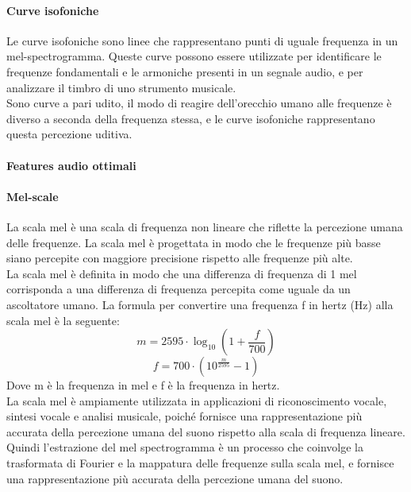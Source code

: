 \paragraph{Curve isofoniche}
Le curve isofoniche sono linee che rappresentano punti di uguale frequenza in un mel-spectrogramma. Queste curve possono essere utilizzate per identificare le frequenze fondamentali e le armoniche presenti in un segnale audio, e per analizzare il timbro di uno strumento musicale.\\
Sono curve a pari udito, il modo di reagire dell'orecchio umano alle frequenze è diverso a seconda della frequenza stessa, e le curve isofoniche rappresentano questa percezione uditiva.\\

\paragraph{Features audio ottimali}

\paragraph{Mel-scale}
La scala mel è una scala di frequenza non lineare che riflette la percezione umana delle frequenze. La scala mel è progettata in modo che le frequenze più basse siano percepite con maggiore precisione rispetto alle frequenze più alte.\\
La scala mel è definita in modo che una differenza di frequenza di 1 mel corrisponda a una differenza di frequenza percepita come uguale da un ascoltatore umano. La formula per convertire una frequenza f in hertz (Hz) alla scala mel è la seguente:
$$m = 2595 \cdot \log_{10}\left(1 + \frac{f}{700}\right)$$
$$f = 700 \cdot (10^{\frac{m}{2595}} - 1)$$
Dove m è la frequenza in mel e f è la frequenza in hertz.\\
La scala mel è ampiamente utilizzata in applicazioni di riconoscimento vocale, sintesi vocale e analisi musicale, poiché fornisce una rappresentazione più accurata della percezione umana del suono rispetto alla scala di frequenza lineare.\\
Quindi l'estrazione del mel spectrogramma è un processo che coinvolge la trasformata di Fourier e la mappatura delle frequenze sulla scala mel, e fornisce una rappresentazione più accurata della percezione umana del suono.\\

